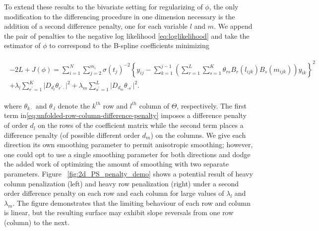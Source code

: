 \documentclass[12pt]{article}
\newcommand{\ms}{\scriptscriptstyle}
\theoremstyle{definition}
\begin{document}
To extend these results to the bivariate setting for regularizing of $\phi$, the only modification to the differencing procedure in one dimension necessary is the addition of a second difference penalty, one for each variable $l$ and $m$. We append the pair of penalties to the negative log likelihood \ref{eq:loglikelihood} and take the estimator of $\phi$ to correspond to the B-spline coefficients minimizing

\begin{align} 
\begin{split}\label{eq:unfolded-difference-penalty-log-likelihood}
-2L + J\left(\phi\right) = \sum_{i=1}^N \sum_{j=2}^{m_i} \sigma\left({t_j}\right)^{-2} \left\{y_{ij} - \sum_{k=1}^{j-1} \left( \sum_{r=1}^L \sum_{s=1}^K \theta_{rs} B_r\left(l_{ijk}\right)B_s\left(m_{ijk}\right)\right)y_{ik} \right\}^2 \\ 
+ \lambda_l \sum_{r^\prime=1}^K \vert D_{d_{\ms l}} \theta_{r^\prime \cdot} \vert^2 + \lambda_m \sum_{s^\prime=1}^L \vert D_{d_{\ms m}} \theta_{\cdot s^\prime} \vert^2.
\end{split}
\end{align}



\noindent
where $\theta_{k \cdot}$ and $\theta_{\cdot l}$ denote the $k^{th}$ row and $l^{th}$ column of $\Theta$, respectively. The first term in\ref{eq:unfolded-row-column-difference-penalty} imposes a difference penalty of order $d_{\ms l}$ on the rows of the coefficient matrix while the second term places a difference penalty (of possible different order $d_{\ms m}$) on the columns. We give each direction its own smoothing parameter to permit anisotropic smoothing; however, one could opt to use a single smoothing parameter for both directions and dodge the added work of optimizing the amount of smoothing with two separate parameters. Figure ~\ref{fig:2d_PS_penalty_demo} shows a potential result of heavy column penalization (left) and heavy row penalization (right) under a second order difference penalty on each row and each column for large values of $\lambda_l$ and $\lambda_m$. The figure demonstrates that the limiting behaviour of each row and column is linear, but the resulting surface may exhibit slope reversals from one row (column) to the next. 
\end{document}
